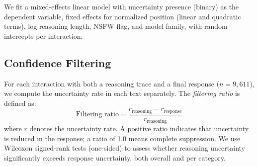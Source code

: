 We fit a mixed-effects linear model \citep{seabold2010statsmodels} with uncertainty presence (binary) as the dependent variable, fixed effects for normalized position (linear and quadratic terms), log reasoning length, NSFW flag, and model family, with random intercepts per interaction.

\subsection{Confidence Filtering}

For each interaction with both a reasoning trace and a final response ($n = 9{,}611$), we compute the uncertainty rate in each text separately. The \emph{filtering ratio} is defined as:
\[
\text{Filtering ratio} = \frac{r_{\text{reasoning}} - r_{\text{response}}}{r_{\text{reasoning}}}
\]
where $r$ denotes the uncertainty rate. A positive ratio indicates that uncertainty is reduced in the response; a ratio of 1.0 means complete suppression. We use Wilcoxon signed-rank tests (one-sided) to assess whether reasoning uncertainty significantly exceeds response uncertainty, both overall and per category.
